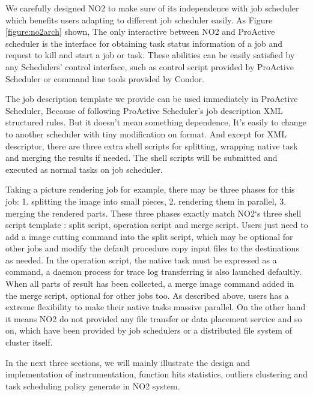 We carefully designed NO2 to make sure of its independence with job scheduler which benefits users adapting to different job scheduler easily. As Figure \ref{figure:no2arch} shown, The only interactive between NO2 and ProActive scheduler is the interface for obtaining task status information of a job and request to kill and start a job or task. These abilities can be easily satisfied by any Schedulers' control interface, such as control script provided by ProActive Scheduler or command line tools provided by Condor. 

The job description template we provide can be used immediately in ProActive Scheduler, Because of following ProActive Scheduler’s job description XML structured rules. But it doesn't mean something dependence, It’s easily to change to another scheduler with tiny modification on format. And except for XML descriptor, there are three extra shell scripts for splitting, wrapping native task and merging the results if needed. The shell scripts will be submitted and executed as normal tasks on job scheduler. 

Taking a picture rendering job for example, there may be three phases for this job: 1. splitting the image into small pieces, 2. rendering them in parallel, 3. merging the rendered parts. These three phases exactly match NO2‘s three shell script template : split script, operation script and merge script. Users just need to add a image cutting command into the split script, which may be optional for other jobs and modify the default procedure copy input files to the destinations as needed. In the operation script, the native task must be  expressed as a command, a daemon process for trace log transferring is also launched defaultly. When all parts of result has been collected, a merge image command added in the merge script, optional for other jobs too. As described above,  users has a extreme flexibility to make their native tasks massive parallel. On the other hand it means NO2 do not provided any file transfer or data placement service and so on, which have been provided by job schedulers or a distributed file system of cluster itself.

In the next three sections, we will mainly illustrate the design and implementation of instrumentation, function hits statistics, outliers clustering and task scheduling policy generate in NO2 system.